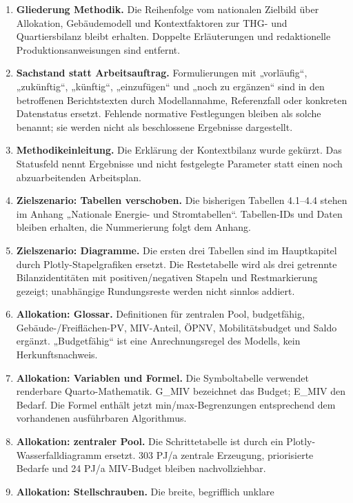 \documentclass[
  ngerman,
  a4paper,
  DIV=11]{scrreprt}
\begin{document}
\begin{enumerate}
\def\labelenumi{\arabic{enumi}.}
\item
  \textbf{Gliederung Methodik.} Die Reihenfolge vom nationalen Zielbild
  über Allokation, Gebäudemodell und Kontextfaktoren zur THG- und
  Quartiersbilanz bleibt erhalten. Doppelte Erläuterungen und
  redaktionelle Produktionsanweisungen sind entfernt.
\item
  \textbf{Sachstand statt Arbeitsauftrag.} Formulierungen mit
  „vorläufig``, „zukünftig``, „künftig``, „einzufügen`` und „noch zu
  ergänzen`` sind in den betroffenen Berichtstexten durch Modellannahme,
  Referenzfall oder konkreten Datenstatus ersetzt. Fehlende normative
  Festlegungen bleiben als solche benannt; sie werden nicht als
  beschlossene Ergebnisse dargestellt.
\item
  \textbf{Methodikeinleitung.} Die Erklärung der Kontextbilanz wurde
  gekürzt. Das Statusfeld nennt Ergebnisse und nicht festgelegte
  Parameter statt einen noch abzuarbeitenden Arbeitsplan.
\item
  \textbf{Zielszenario: Tabellen verschoben.} Die bisherigen Tabellen
  4.1--4.4 stehen im Anhang „Nationale Energie- und Stromtabellen``.
  Tabellen-IDs und Daten bleiben erhalten, die Nummerierung folgt dem
  Anhang.
\item
  \textbf{Zielszenario: Diagramme.} Die ersten drei Tabellen sind im
  Hauptkapitel durch Plotly-Stapelgrafiken ersetzt. Die Restetabelle
  wird als drei getrennte Bilanzidentitäten mit positiven/negativen
  Stapeln und Restmarkierung gezeigt; unabhängige Rundungsreste werden
  nicht sinnlos addiert.
\item
  \textbf{Allokation: Glossar.} Definitionen für zentralen Pool,
  budgetfähig, Gebäude-/Freiflächen-PV, MIV-Anteil, ÖPNV,
  Mobilitätsbudget und Saldo ergänzt. „Budgetfähig`` ist eine
  Anrechnungsregel des Modells, kein Herkunftsnachweis.
\item
  \textbf{Allokation: Variablen und Formel.} Die Symboltabelle verwendet
  renderbare Quarto-Mathematik. G\_MIV bezeichnet das Budget; E\_MIV den
  Bedarf. Die Formel enthält jetzt min/max-Begrenzungen entsprechend dem
  vorhandenen ausführbaren Algorithmus.
\item
  \textbf{Allokation: zentraler Pool.} Die Schrittetabelle ist durch ein
  Plotly-Wasserfalldiagramm ersetzt. 303 PJ/a zentrale Erzeugung,
  priorisierte Bedarfe und 24 PJ/a MIV-Budget bleiben nachvollziehbar.
\item
  \textbf{Allokation: Stellschrauben.} Die breite, begrifflich unklare

\end{enumerate}
\end{document}
